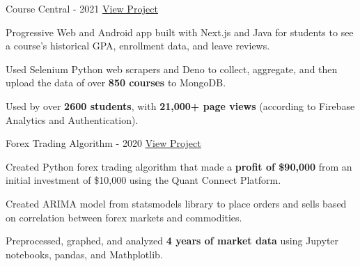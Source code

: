 

\begin{cventries}

  \cventry
    {} %
    {Course Central - 2021} %
    {\href{https://coursecentral.ca/}{\underline{View Project}}} %
    {} %
    {
      \begin{cvitems} %
        \item {Progressive Web and Android app built with Next.js and Java for students to see a course's historical GPA, enrollment data, and leave reviews.}
        \item {Used Selenium Python web scrapers and Deno to collect, aggregate, and then upload the data of over \textbf{850 courses} to MongoDB.}
        \item {Used by over \textbf{2600 students}, with \textbf{21,000+ page views} (according to Firebase Analytics and Authentication).}
      \end{cvitems}
    }

  \cventry
    {} %
    {Forex Trading Algorithm - 2020} %
    {\href{https://github.com/KnlnKS/Forex-Price-Predictor-Quantconnect}{\underline{View Project}}} %
    {} %
    {
      \begin{cvitems} %
        \item {Created Python forex trading algorithm that made a \textbf{profit of \$90,000} from an initial investment of \$10,000 using the Quant Connect Platform.}
        \item {Created ARIMA model from statsmodels library to place orders and sells based on correlation between forex markets and commodities.}
        \item {Preprocessed, graphed, and analyzed \textbf{4 years of market data} using Jupyter notebooks, pandas, and Mathplotlib.}
      \end{cvitems}
    }


\end{cventries}
